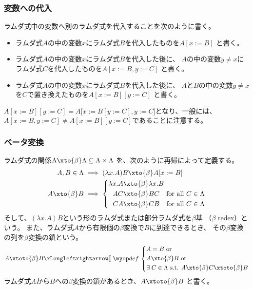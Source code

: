 {\subsubsection{変数への代入}\label{s3:変数への代入} %
	ラムダ式中の変数へ別のラムダ式を代入することを次のように書く。
	\begin{itemize}\setlength{\itemsep}{-1mm} %
		\item ラムダ式$A$の中の変数$x$にラムダ式$B$を代入したものを$A[x:=B]$
		と書く。
		\item ラムダ式$A$の中の変数$x$にラムダ式$B$を代入した後に、
		$A$の中の変数$y\neq x$にラムダ式$C$を代入したものを$A[x:=B,y:=C]$
		と書く。
		\item ラムダ式$A$の中の変数$x$にラムダ式$B$を代入した後に、
		$A$と$B$の中の変数$y\neq x$を$C$で置き換えたものを$A[x:=B][y:=C]$
		と書く。
	\end{itemize} %
	$A[x:=B][y:=C]=A\bigl[x:=B[y:=C],y:=C\bigr]$となり、一般には、
	$A[x:=B,y:=C]\neq A[x:=B][y:=C]$であることに注意する。
\subsubsection{ベータ変換}\label{s3:ベータ変換} %
	ラムダ式の関係$\Lambda\xto{\beta}\Lambda\subseteq\Lambda\times\Lambda$
	を、次のように再帰によって定義する。
	\begin{equation*}\begin{split}
		A,B\in\Lambda &\implies (\lambda x.A)B \xto{\beta} A[x:=B] \\
		A\xto{\beta}B &\implies \left\{\begin{split}
			\lambda x.A &\xto{\beta} \lambda x.B \\
			AC &\xto{\beta} BC  \quad\text{for all } C\in\Lambda \\
			CA &\xto{\beta} CB  \quad\text{for all } C\in\Lambda \\
		\end{split}\right. \\
	\end{split}\end{equation*}
	そして、$(\lambda x.A)B$という形のラムダ式または部分ラムダ式を$\beta$基
	（$\beta$ redex）という。
	また、ラムダ式$A$から有限個の$\beta$変換で$B$に到達できるとき、
	その$\beta$変換の列を$\beta$変換の鎖という。
	\begin{equation*}\begin{split}
		A\xtoto{\beta}B \xiff{\dfn} \left\{\begin{split}
			& A = B \text{ or} \\
			& A\xto{\beta}B \text{ or} \\
			& \exists\; C\in\Lambda \text{ s.t. }
				A\xto{\beta}C\xtoto{\beta} B \\
		\end{split}\right. \\
	\end{split}\end{equation*}
	ラムダ式$A$から$B$への$\beta$変換の鎖があるとき、$A\xtoto{\beta}B$
	と書く。
}
